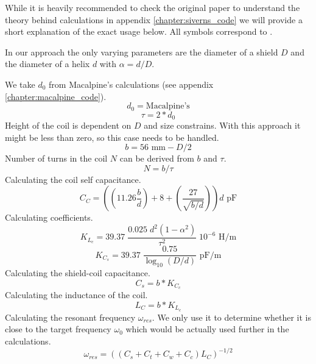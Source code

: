 While it is heavily recommended to check the original \cite{Siverns2012} paper to understand the theory behind calculations in appendix \ref{chapter:siverns_code} we will provide a short explanation of the exact usage below. All symbols correspond to \cite{Siverns2012}.

In our approach the only varying parameters are the diameter of a shield $D$ and the diameter of a helix $d$ with $\alpha = d / D$.

We take $d_0$ from Macalpine's calculations (see appendix \ref{chapter:macalpine_code}).
\begin{equation}
	d_0 = \text{Macalpine's}
\end{equation}
\begin{equation}
	\tau = 2*d_0
\end{equation}
Height of the coil is dependent on $D$ and size constrains. With this approach it might be less than zero, so this case needs to be handled.
\begin{equation}
	b = 56 \text{ mm} - D/2
\end{equation}
Number of turns in the coil $N$ can be derived from $b$ and $\tau$.
\begin{equation}
	N = b/\tau
\end{equation}
Calculating the coil self capacitance.
\begin{equation}
	C_C = \left( \left( 11.26 \frac{b}{d} \right) + 8 + \left( \frac{27}{\sqrt{b/d}} \right) \right) d \text{ pF}
\end{equation}
Calculating coefficients.
\begin{equation}
	K_{L_c} = 39.37 \; \frac{0.025 \; d^2 \left(1 - \alpha^2 \right)}{\tau^2} \; 10^{-6} \text{ H/m}
\end{equation}
\begin{equation}
	K_{C_s} = 39.37 \; \frac{0.75}{\log_{10}{(D/d)}} \text{ pF/m}
\end{equation}
Calculating the shield-coil capacitance.
\begin{equation}
	C_s = b* K_{C_c}
\end{equation}
Calculating the inductance of the coil.
\begin{equation}
	L_C = b* K_{L_c}
\end{equation}
Calculating the resonant frequency $\omega_{res}$. We only use it to determine whether it is close to the target frequency $\omega_0$ which would be actually used further in the calculations.
\begin{equation}
	\omega_{res} = \left( \left( C_s + C_t + C_w + C_c \right) L_C \right)^{-1/2}
\end{equation}
